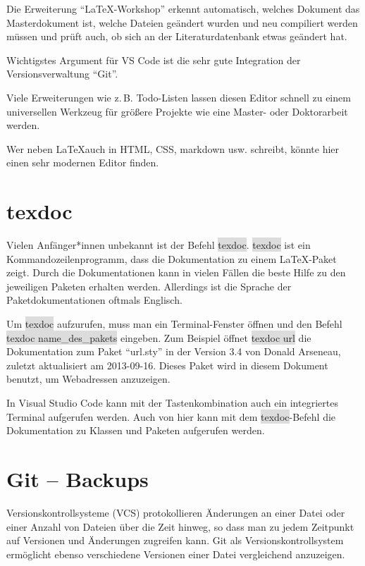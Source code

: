 \documentclass[12pt,	%
				headings=small,		%
				toc=bibliography,	%
			]	%
{scrreprt}		%
\newcommand{\inlinebefehl}[1]{\colorbox{Gainsboro}{\textsf{#1}}} %
\begin{document}
	Die Erweiterung \enquote{LaTeX-Workshop} erkennt automatisch, welches Dokument das Masterdokument ist, welche Dateien geändert wurden und neu compiliert werden müssen und prüft auch, ob sich an der Literaturdatenbank etwas geändert hat.\autocite{VSCode:LatexWorkshop}

	Wichtigstes Argument für VS Code ist die sehr gute Integration der Versionsverwaltung \enquote{Git}.

	Viele Erweiterungen wie z.\,B. Todo-Listen lassen diesen Editor schnell zu einem universellen Werkzeug für größere Projekte wie eine Master- oder Doktorarbeit werden.

	Wer neben \LaTeX auch in HTML, CSS, markdown usw. schreibt, könnte hier einen sehr modernen Editor finden.


\section{texdoc}
\label{texdoc}
Vielen Anfänger*innen unbekannt ist der Befehl \inlinebefehl{texdoc}. \inlinebefehl{texdoc} ist ein Kommandozeilenprogramm, dass die Dokumentation zu einem \LaTeX-Paket zeigt. Durch die Dokumentationen kann in vielen Fällen die beste Hilfe zu den jeweiligen Paketen erhalten werden. Allerdings ist die Sprache der Paketdokumentationen oftmals Englisch. 

Um  \inlinebefehl{texdoc} aufzurufen, muss man ein Terminal-Fenster öffnen und den Befehl \\\inlinebefehl{texdoc name\_des\_pakets} eingeben. Zum Beispiel öffnet \inlinebefehl{texdoc url} die Dokumentation zum Paket \enquote{url.sty} in der Version 3.4 von Donald Arseneau, zuletzt aktualisiert am 2013-09-16. Dieses Paket wird in diesem Dokument benutzt, um Webadressen anzuzeigen.

In Visual Studio Code kann mit der Tastenkombination \keys{\ctrl+\shift+\`{}} auch ein integriertes Terminal aufgerufen werden. Auch von hier kann mit dem \inlinebefehl{texdoc}-Befehl die Dokumentation zu Klassen und Paketen aufgerufen werden.


\section{Git -- Backups}
\label{Git}
Versionskontrollsysteme (VCS) protokollieren Änderungen an einer Datei oder einer Anzahl von Dateien über die Zeit hinweg, so dass man zu jedem Zeitpunkt auf Versionen und Änderungen zugreifen kann. Git als Versionskontrollsystem ermöglicht ebenso verschiedene Versionen einer Datei vergleichend anzuzeigen.
\end{document}
